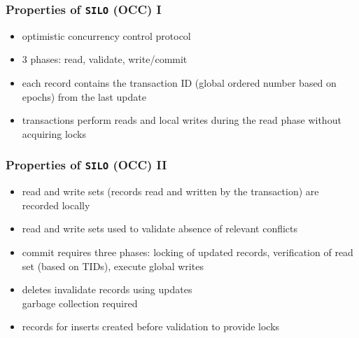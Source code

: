 \begin{frame}
	\frametitle{Properties of \lstinline{SILO} (OCC) I}
	
	\begin{itemize}
		\item	optimistic concurrency control protocol
		\item	3 phases: read, validate, write/commit
		\item	each record contains the transaction ID (global ordered number based on epochs) from the last update
		\item	transactions perform reads and local writes during the read phase without acquiring locks
	\end{itemize}
\end{frame}

\begin{frame}
	\frametitle{Properties of \lstinline{SILO} (OCC) II}
	
	\begin{itemize}
		\item	read and write sets (records read and written by the transaction) are recorded locally
		\item	read and write sets used to validate absence of relevant conflicts
		\item	commit requires three phases: locking of updated records, verification of read set (based on TIDs), execute global writes
		\item	deletes invalidate records using updates \\ \bm{$\rightarrow$} garbage collection required
		\item	records for inserts created before validation to provide locks
	\end{itemize}
\end{frame}

